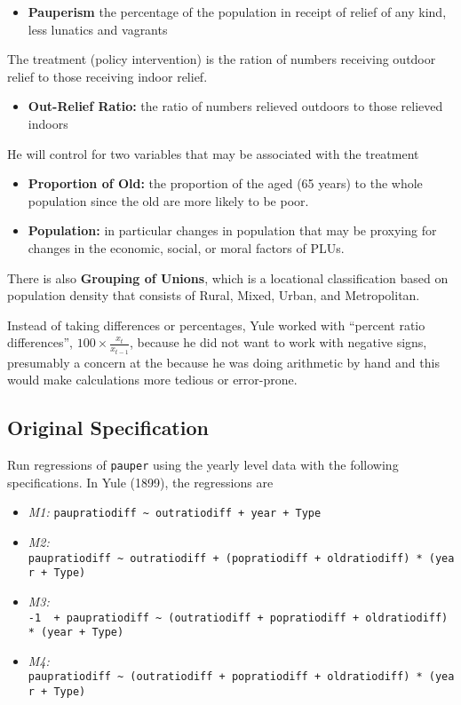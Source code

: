 \documentclass[]{article}
\providecommand{\tightlist}{%
  \setlength{\itemsep}{0pt}\setlength{\parskip}{0pt}}
\begin{document}
\begin{itemize}
\tightlist
\item
  \textbf{Pauperism} the percentage of the population in receipt of
  relief of any kind, less lunatics and vagrants
\end{itemize}

The treatment (policy intervention) is the ration of numbers receiving
outdoor relief to those receiving indoor relief.

\begin{itemize}
\tightlist
\item
  \textbf{Out-Relief Ratio:} the ratio of numbers relieved outdoors to
  those relieved indoors
\end{itemize}

He will control for two variables that may be associated with the
treatment

\begin{itemize}
\tightlist
\item
  \textbf{Proportion of Old:} the proportion of the aged (65 years) to
  the whole population since the old are more likely to be poor.
\item
  \textbf{Population:} in particular changes in population that may be
  proxying for changes in the economic, social, or moral factors of
  PLUs.
\end{itemize}

There is also \textbf{Grouping of Unions}, which is a locational
classification based on population density that consists of Rural,
Mixed, Urban, and Metropolitan.

Instead of taking differences or percentages, Yule worked with ``percent
ratio differences'', \(100 \times \frac{x_{t}}{x_{t-1}}\), because he
did not want to work with negative signs, presumably a concern at the
because he was doing arithmetic by hand and this would make calculations
more tedious or error-prone.

\subsection{Original Specification}\label{original-specification}

Run regressions of \texttt{pauper} using the yearly level data with the
following specifications. In Yule (1899), the regressions are

\begin{itemize}
\tightlist
\item
  \emph{M1:}
  \texttt{paupratiodiff\ \textasciitilde{}\ outratiodiff\ +\ year\ +\ Type}
\item
  \emph{M2:}
  \texttt{paupratiodiff\ \textasciitilde{}\ outratiodiff\ +\ (popratiodiff\ +\ oldratiodiff)\ *\ (year\ +\ Type)}
\item
  \emph{M3:}
  \texttt{-1\ \ +\ paupratiodiff\ \textasciitilde{}\ (outratiodiff\ +\ popratiodiff\ +\ oldratiodiff)\ *\ (year\ +\ Type)}
\item
  \emph{M4:}
  \texttt{paupratiodiff\ \textasciitilde{}\ (outratiodiff\ +\ popratiodiff\ +\ oldratiodiff)\ *\ (year\ +\ Type)}
\end{itemize}
\end{document}

